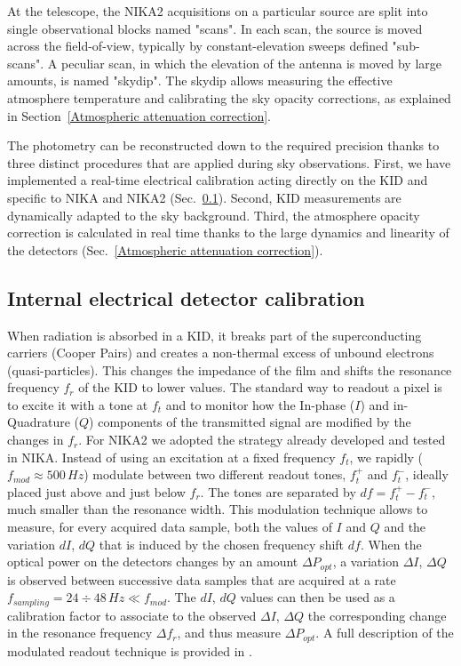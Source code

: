 \documentclass[]{aa} %
\begin{document}
At the telescope, the NIKA2 acquisitions on a particular source are split into single observational blocks named "scans". In each scan, the source is moved across the field-of-view, typically by constant-elevation sweeps defined "sub-scans". A peculiar scan, in which the elevation of the antenna is moved by large amounts, is named "skydip". The skydip allows measuring the effective atmosphere temperature and calibrating the sky opacity corrections, as explained in Section~\ref{Atmospheric attenuation correction}.

The photometry can be reconstructed down to the required precision thanks to three distinct procedures that are applied during sky observations. First, we have implemented a real-time electrical calibration acting directly on the KID and specific to NIKA and NIKA2 (Sec.~\ref{Internal detectors calibration}). Second, KID measurements are dynamically adapted to the sky background. Third, the atmosphere opacity correction is calculated in real time thanks to the large dynamics and linearity of the detectors (Sec.~\ref{Atmospheric attenuation correction}).



\subsection{Internal electrical detector calibration}
\label{Internal detectors calibration}

When radiation is absorbed in a KID, it breaks part of the superconducting carriers (Cooper Pairs) and creates a non-thermal excess of unbound electrons (quasi-particles). This changes the impedance of the film and shifts the resonance frequency $f_r$ of the KID to lower values.
The standard way to readout a pixel is to excite it with a tone at $f_t$ and to monitor how the In-phase ($I$) and in-Quadrature ($Q$) components of the transmitted signal are modified by the changes in $f_r$. For NIKA2 we adopted the strategy already developed and tested in NIKA. Instead of using an excitation at a fixed frequency $f_t$, we rapidly ($f_{mod} \approx 500\,Hz$) modulate between two different readout tones, $f_t^+$ and $f_t^-$, ideally placed just above and just below $f_r$. The tones are separated by $df=f_t^+-f_t^-$, much smaller than the resonance width. This modulation technique allows to measure, for every acquired data sample, both the values of $I$ and $Q$ and the variation $dI$, $dQ$ that is induced by the chosen frequency shift $df$. When the optical power on the detectors changes by an amount $\Delta P_{opt}$, a variation $\Delta I$, $\Delta Q$ is observed between successive data samples that are acquired at a rate $f_{sampling} = 24\div48\,Hz \ll  f_{mod} $. The $dI$, $dQ$ values can then be used as a calibration factor to associate to the observed $\Delta I$, $\Delta Q$ the corresponding change in the resonance frequency $\Delta f_r$, and thus measure $\Delta P_{opt}$. A full description of the modulated readout technique is provided in \cite{Calvo2013}.
\end{document}
